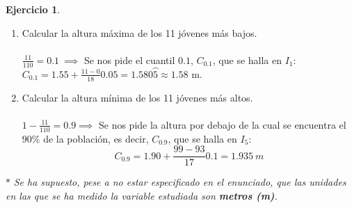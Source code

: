 \documentclass[a4paper, 12pt]{article}
\theoremstyle{definition}
\newtheorem{ej}{Ejercicio}
\begin{document}
\begin{ej}
\begin{enumerate}[label=\textit{\alph*)}]
    \item Calcular la altura máxima de los 11 jóvenes más bajos.\\\\
    $\frac{11}{110} = 0.1 \ \implies$ Se nos pide el cuantil $0.1$, $C_{0.1}$, que se halla en $I_{1}$: \\
    $C_{0.1} = 1.55 + \frac{11-0}{18}0.05 = 1.580\wideparen{5} \approx 1.58$ m. \\
    \item Calcular la altura mínima de los 11 jóvenes más altos.
    \\\\
    $1-\frac{11}{110}=0.9 \implies$ Se nos pide la altura por debajo de la cual se encuentra el $90\%$ de la población, es decir, $C_{0.9}$, que se halla en $I_{5}$: \\
    $$C_{0.9} = 1.90 + \frac{99-93}{17}0.1 = 1.935 \ m$$
\end{enumerate}

\(\ast\) \textit{Se ha supuesto, pese a no estar especificado en el enunciado, que las unidades en las que se ha medido la variable estudiada son \textbf{metros (m)}.}

\end{ej}
\end{document}
